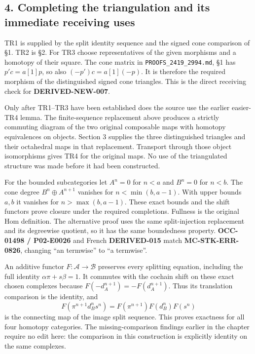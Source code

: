 \documentclass[11pt]{article}
\begin{document}
\subsection{4. Completing the triangulation and its immediate receiving uses}\label{proofs-2995-3485-completing-the-triangulation-and-its-immediate-receiving-uses}

TR1 is supplied by the split identity sequence and the signed cone comparison of §1. TR2 is §2. For TR3 choose representatives of the given morphisms and a homotopy of their square. The cone matrix in \texttt{PROOFS\_\allowbreak{}2419\_\allowbreak{}2994.\allowbreak{}md},\allowbreak{} §1 has \(p'c=a[1]p\),\allowbreak{} so also \((-p')c=a[1](-p)\). It is therefore the required morphism of the distinguished signed cone triangles. This is the direct receiving check for \textbf{DERIVED-NEW-007}.

Only after TR1–\allowbreak{}TR3 have been established does the source use the earlier easier-TR4 lemma. The finite-sequence replacement above produces a strictly commuting diagram of the two original composable maps with homotopy equivalences on objects. Section 3 supplies the three distinguished triangles and their octahedral maps in that replacement. Transport through those object isomorphisms gives TR4 for the original maps. No use of the triangulated structure was made before it had been constructed.

For the bounded subcategories let \(A^n=0\) for \(n<a\) and \(B^n=0\) for \(n<b\). The cone degree \(B^n\oplus A^{n+1}\) vanishes for \(n<\min(b,a-1)\). With upper bounds \(a,b\) it vanishes for \(n>\max(b,a-1)\). These exact bounds and the shift functors prove closure under the required completions. Fullness is the original Hom definition. The alternative proof uses the same split-injection replacement and its degreewise quotient,\allowbreak{} so it has the same boundedness property. \textbf{OCC-01498 /\allowbreak{} P02-E0026} and French \textbf{DERIVED-015} match \textbf{MC-STK-ERR-0826},\allowbreak{} changing ``an termwise'' to ``a termwise''.

An additive functor \(F:\mathcal A\to\mathcal B\) preserves every splitting equation,\allowbreak{} including the full identity \(\alpha\pi+s\beta=1\). It commutes with the cochain shift on these exact chosen complexes because \(F(-d_A^{n+1})=-F(d_A^{n+1})\). Thus its translation comparison is the identity,\allowbreak{} and \[
F(\pi^{n+1}d_B^ns^n)=F(\pi^{n+1})F(d_B^n)F(s^n)
\] is the connecting map of the image split sequence. This proves exactness for all four homotopy categories. The missing-comparison findings earlier in the chapter require no edit here:\allowbreak{} the comparison in this construction is explicitly identity on the same complexes.
\end{document}
